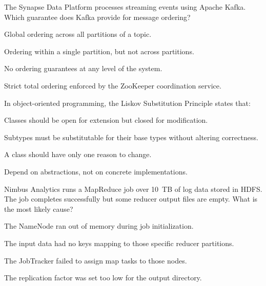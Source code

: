 \documentclass[11pt,a4paper]{article}
\begin{document}
\begin{questionblock}
 The Synapse Data Platform processes streaming events using Apache Kafka. Which guarantee does Kafka provide for message ordering?
\begin{mcoptions}
  \item[\textbf{A.}] Global ordering across all partitions of a topic.
  \item[\textbf{B.}] Ordering within a single partition, but not across partitions.
  \item[\textbf{C.}] No ordering guarantees at any level of the system.
  \item[\textbf{D.}] Strict total ordering enforced by the ZooKeeper coordination service.
\end{mcoptions}
\end{questionblock}

\begin{questionblock}
 In object-oriented programming, the Liskov Substitution Principle states that:
\begin{mcoptions}
  \item[\textbf{A.}] Classes should be open for extension but closed for modification.
  \item[\textbf{B.}] Subtypes must be substitutable for their base types without altering correctness.
  \item[\textbf{C.}] A class should have only one reason to change.
  \item[\textbf{D.}] Depend on abstractions, not on concrete implementations.
\end{mcoptions}
\end{questionblock}

\newpage

\begin{questionblock}
 Nimbus Analytics runs a MapReduce job over 10~TB of log data stored in HDFS. The job completes successfully but some reducer output files are empty. What is the most likely cause?
\begin{mcoptions}
  \item[\textbf{A.}] The NameNode ran out of memory during job initialization.
  \item[\textbf{B.}] The input data had no keys mapping to those specific reducer partitions.
  \item[\textbf{C.}] The JobTracker failed to assign map tasks to those nodes.
  \item[\textbf{D.}] The replication factor was set too low for the output directory.
\end{mcoptions}
\end{questionblock}
\end{document}
